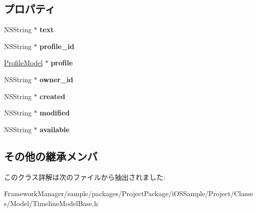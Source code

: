 \subsection*{プロパティ}
\begin{DoxyCompactItemize}
\item 
\hypertarget{interface_timeline_model_base_ae1dbf9b58036e1072b5da29382b235f7}{}N\+S\+String $\ast$ {\bfseries text}\label{interface_timeline_model_base_ae1dbf9b58036e1072b5da29382b235f7}

\item 
\hypertarget{interface_timeline_model_base_a43d695245560df2dd75ab5f2d5ab7ebb}{}N\+S\+String $\ast$ {\bfseries profile\+\_\+id}\label{interface_timeline_model_base_a43d695245560df2dd75ab5f2d5ab7ebb}

\item 
\hypertarget{interface_timeline_model_base_ad6eaa3383525ad1352f21f46406f8633}{}\hyperlink{interface_profile_model}{Profile\+Model} $\ast$ {\bfseries profile}\label{interface_timeline_model_base_ad6eaa3383525ad1352f21f46406f8633}

\item 
\hypertarget{interface_timeline_model_base_a30e15eb3f412b850c65ee2c6599ebfb3}{}N\+S\+String $\ast$ {\bfseries owner\+\_\+id}\label{interface_timeline_model_base_a30e15eb3f412b850c65ee2c6599ebfb3}

\item 
\hypertarget{interface_timeline_model_base_a4aab27254bb80e9b666cad69c349982d}{}N\+S\+String $\ast$ {\bfseries created}\label{interface_timeline_model_base_a4aab27254bb80e9b666cad69c349982d}

\item 
\hypertarget{interface_timeline_model_base_a38a373cd7a8510f33bf835d0cdb92633}{}N\+S\+String $\ast$ {\bfseries modified}\label{interface_timeline_model_base_a38a373cd7a8510f33bf835d0cdb92633}

\item 
\hypertarget{interface_timeline_model_base_af7ae539228a3539bb6c0816b485b6b73}{}N\+S\+String $\ast$ {\bfseries available}\label{interface_timeline_model_base_af7ae539228a3539bb6c0816b485b6b73}

\end{DoxyCompactItemize}
\subsection*{その他の継承メンバ}


このクラス詳解は次のファイルから抽出されました\+:\begin{DoxyCompactItemize}
\item 
Framework\+Manager/sample/packages/\+Project\+Package/i\+O\+S\+Sample/\+Project/\+Classes/\+Model/Timeline\+Model\+Base.\+h\end{DoxyCompactItemize}
